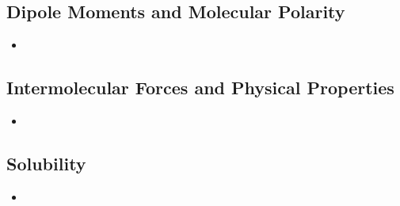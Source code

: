 \documentclass[12pt,a4paper]{article}
\begin{document}
\subsection{Dipole Moments and Molecular Polarity}
\begin{itemize}
    \item 
\end{itemize}

\subsection{Intermolecular Forces and Physical Properties}
\begin{itemize}
    \item 
\end{itemize}

\subsection{Solubility}
\begin{itemize}
    \item 
\end{itemize}
\end{document}
